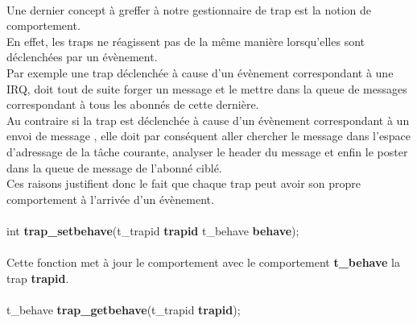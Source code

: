 \documentclass[10pt,a4wide]{article}
\begin{document}
\paragraph{}

Une dernier concept \`a greffer \`a notre gestionnaire de trap est la notion de comportement.\\
En effet, les traps ne r\'eagissent pas de la m\^eme mani\`ere lorsqu'elles sont d\'eclench\'ees par
un \'ev\`enement.\\
Par exemple une trap d\'eclench\'ee \`a cause d'un \'ev\`enement correspondant \`a une IRQ, doit
tout de suite forger un message et le mettre dans la queue de messages correspondant \`a tous les abonn\'es
de cette derni\`ere.\\
Au contraire si la trap est d\'eclench\'ee \`a cause d'un \'ev\`enement correspondant \`a un envoi de message
, elle doit par cons\'equent aller chercher le message dans l'espace d'adressage de la t\^ache courante, analyser
le header du message et enfin le poster dans la queue de message de l'abonn\'e cibl\'e.\\
Ces raisons justifient donc le fait que chaque trap peut avoir son propre comportement \`a l'arriv\'ee d'un
\'ev\`enement.

\paragraph{}

\hspace{1.5cm}int \textbf{trap\_setbehave}(t\_trapid \textbf{trapid}
                                           t\_behave \textbf{behave});

\paragraph{}

Cette fonction met \`a jour le comportement avec le comportement \textbf{t\_behave} la trap \textbf{trapid}.

\paragraph{}

\hspace{1.5cm}t\_behave \textbf{trap\_getbehave}(t\_trapid \textbf{trapid});

\paragraph{}
\end{document}
